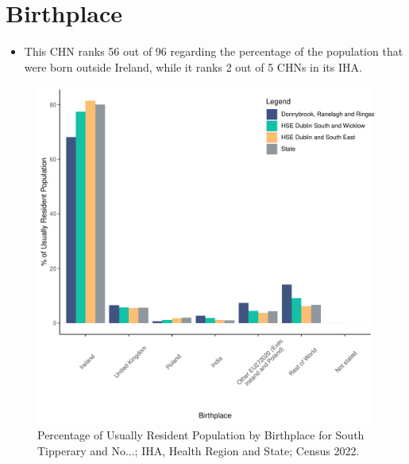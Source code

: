 \documentclass{article}
\begin{document}
\section{Birthplace}\label{sect:Birth}
\begin{itemize}
\item This CHN ranks  56 out of 96 regarding the percentage of the population that were born outside Ireland, while it ranks  2 out of 5 CHNs in its IHA.
\end{itemize}
\begin{figure}[H]
	\centering
	\includegraphics[width = 130mm]{../figures/BirthED.pdf}
	\caption{Percentage of Usually Resident Population by Birthplace for South Tipperary and No...; IHA, Health Region and State; Census 2022.}
	\label{fig:vbnv}
	\end{figure}
	
\end{document}
